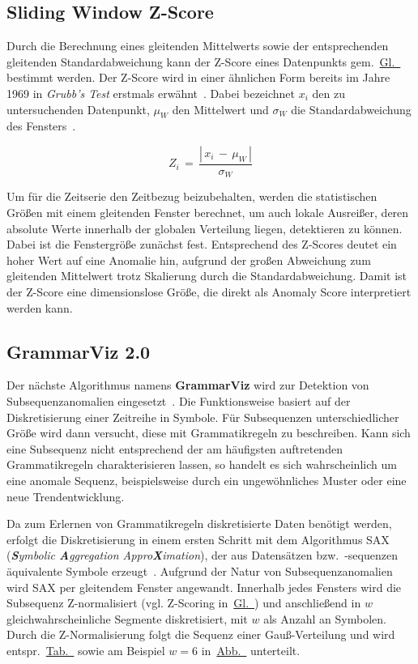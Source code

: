 \subsection{Sliding Window Z-Score}
Durch die Berechnung eines gleitenden Mittelwerts sowie der entsprechenden gleitenden Standardabweichung kann der Z-Score eines Datenpunkts
gem.~\hyperref[eq:zscore]{Gl.~} bestimmt werden. Der Z-Score wird in einer ähnlichen Form bereits im Jahre 1969 in \textit{Grubb's
Test} erstmals erwähnt~\cite{Grubbs1969}. Dabei bezeichnet $x_i$ den zu untersuchenden Datenpunkt, $\mu_W$ den Mittelwert und $\sigma_W$ die
Standardabweichung des Fensters~\Cite[S.~15:31]{Chandola2009}.

\begin{equation}
    Z_i\, =\, \frac{|\, x_i\,-\, \mu_W\,|}{\sigma_W}
\label{eq:zscore}
\end{equation}

Um für die Zeitserie den Zeitbezug beizubehalten, werden die statistischen Größen mit einem gleitenden Fenster berechnet, um auch lokale Ausreißer,
deren absolute Werte innerhalb der globalen Verteilung liegen, detektieren zu können. Dabei ist die Fenstergröße zunächst fest. Entsprechend des
Z-Scores deutet ein hoher Wert auf eine Anomalie hin, aufgrund der großen Abweichung zum gleitenden Mittelwert trotz Skalierung durch die
Standardabweichung. Damit ist der Z-Score eine dimensionslose Größe, die direkt als Anomaly Score interpretiert werden kann.

\subsection{GrammarViz 2.0}
Der nächste Algorithmus namens \textbf{GrammarViz} wird zur Detektion von Subsequenzanomalien eingesetzt~\cite{Senin2015}. Die Funktionsweise
basiert auf der Diskretisierung einer Zeitreihe in Symbole. Für Subsequenzen unterschiedlicher Größe wird dann versucht, diese mit
Grammatikregeln zu beschreiben. Kann sich eine Subsequenz nicht entsprechend der am häufigsten auftretenden Grammatikregeln charakterisieren
lassen, so handelt es sich wahrscheinlich um eine anomale Sequenz, beispielsweise durch ein ungewöhnliches Muster oder eine neue Trendentwicklung.

Da zum Erlernen von Grammatikregeln diskretisierte Daten benötigt werden, erfolgt die Diskretisierung in einem ersten Schritt mit dem Algorithmus SAX
(\textit{\textbf{S}ymbolic \textbf{A}ggregation Appro\textbf{X}imation}), der aus Datensätzen bzw.~-sequenzen äquivalente Symbole erzeugt~\cite{Patel}.
Aufgrund der Natur von Subsequenzanomalien wird SAX per gleitendem Fenster angewandt. Innerhalb jedes Fensters wird die Subsequenz Z-normalisiert (vgl.
Z-Scoring in~\hyperref[eq:zscore]{Gl.~}) und anschließend in $w$ gleichwahrscheinliche Segmente diskretisiert, mit $w$ als Anzahl an
Symbolen. Durch die Z-Normalisierung folgt die Sequenz einer Gauß-Verteilung und wird
entspr.~\hyperref[tab:normalverteilung_segmente]{Tab.~} sowie am Beispiel $w=6$
in~\hyperref[fig:normalverteilung_segmente]{Abb.~} unterteilt.


